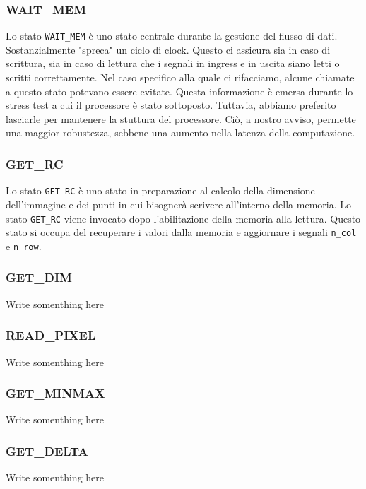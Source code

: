 \documentclass{article}
\begin{document}
\subsubsection{WAIT\_MEM}%
Lo stato \texttt{WAIT\_MEM} è uno stato centrale durante la gestione del flusso di dati. Sostanzialmente "spreca" un ciclo di clock. Questo ci assicura sia in caso di scrittura, sia in caso di lettura che i segnali in ingress e in uscita siano letti o scritti correttamente. Nel caso specifico alla quale ci rifacciamo, alcune chiamate a questo stato potevano essere evitate. Questa informazione è emersa durante lo stress test a cui il processore è stato sottoposto. Tuttavia, abbiamo preferito lasciarle per mantenere la stuttura del processore. Ciò, a nostro avviso, permette una maggior robustezza, sebbene una aumento nella latenza della computazione.

\subsubsection{GET\_RC}%
Lo stato \texttt{GET\_RC} è uno stato in preparazione al calcolo della dimensione dell'immagine e dei punti in cui bisognerà scrivere all'interno della memoria. Lo stato \texttt{GET\_RC} viene invocato dopo l'abilitazione della memoria alla lettura. Questo stato si occupa del recuperare i valori dalla memoria e aggiornare i segnali \texttt{n\_col} e \texttt{n\_row}.

\subsubsection{GET\_DIM}%
Write somenthing here

\subsubsection{READ\_PIXEL}%
Write somenthing here

\subsubsection{GET\_MINMAX}%
Write somenthing here

\subsubsection{GET\_DELTA}%
Write somenthing here
\end{document}
